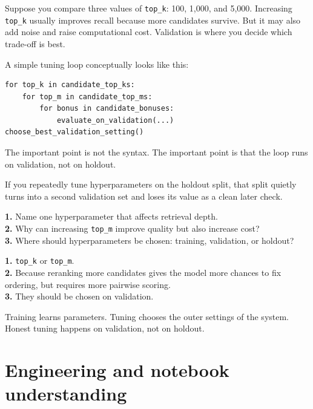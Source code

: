 \documentclass[11pt,oneside]{report}
\newcommand{\code}[1]{\texttt{#1}}
\begin{document}
\begin{examplebox}
Suppose you compare three values of \code{top\_k}: 100, 1{,}000, and 5{,}000. Increasing \code{top\_k} usually improves recall because more candidates survive. But it may also add noise and raise computational cost. Validation is where you decide which trade-off is best.
\end{examplebox}

\begin{formulabox}
A simple tuning loop conceptually looks like this:
\begin{lstlisting}
for top_k in candidate_top_ks:
    for top_m in candidate_top_ms:
        for bonus in candidate_bonuses:
            evaluate_on_validation(...)
choose_best_validation_setting()
\end{lstlisting}
The important point is not the syntax. The important point is that the loop runs on validation, not on holdout.
\end{formulabox}

\begin{warningbox}
If you repeatedly tune hyperparameters on the holdout split, that split quietly turns into a second validation set and loses its value as a clean later check.
\end{warningbox}

\begin{selfcheckbox}
\textbf{1.} Name one hyperparameter that affects retrieval depth.\\
\textbf{2.} Why can increasing \code{top\_m} improve quality but also increase cost?\\
\textbf{3.} Where should hyperparameters be chosen: training, validation, or holdout?
\end{selfcheckbox}

\begin{answerbox}
\textbf{1.} \code{top\_k} or \code{top\_m}.\\
\textbf{2.} Because reranking more candidates gives the model more chances to fix ordering, but requires more pairwise scoring.\\
\textbf{3.} They should be chosen on validation.
\end{answerbox}

\begin{rememberbox}
Training learns parameters. Tuning chooses the outer settings of the system. Honest tuning happens on validation, not on holdout.
\end{rememberbox}


\part[Pipeline Engineering]{Engineering and notebook understanding}
\end{document}
